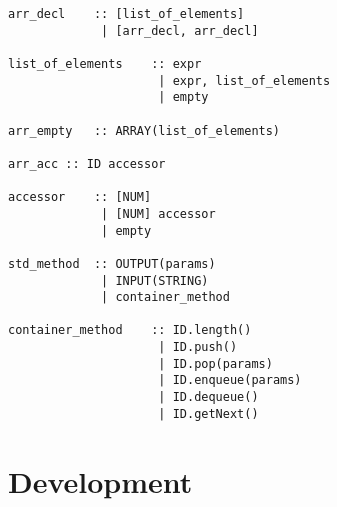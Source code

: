 \documentclass[12pt]{article}
\begin{document}
\begin{verbatim}
arr_decl    :: [list_of_elements]
             | [arr_decl, arr_decl]

list_of_elements    :: expr
                     | expr, list_of_elements
                     | empty

arr_empty   :: ARRAY(list_of_elements)

arr_acc :: ID accessor

accessor    :: [NUM]
             | [NUM] accessor
             | empty

std_method  :: OUTPUT(params)
             | INPUT(STRING)
             | container_method

container_method    :: ID.length()
                     | ID.push()
                     | ID.pop(params)
                     | ID.enqueue(params)
                     | ID.dequeue()
                     | ID.getNext()

\end{verbatim}
\section{Development}
\end{document}
